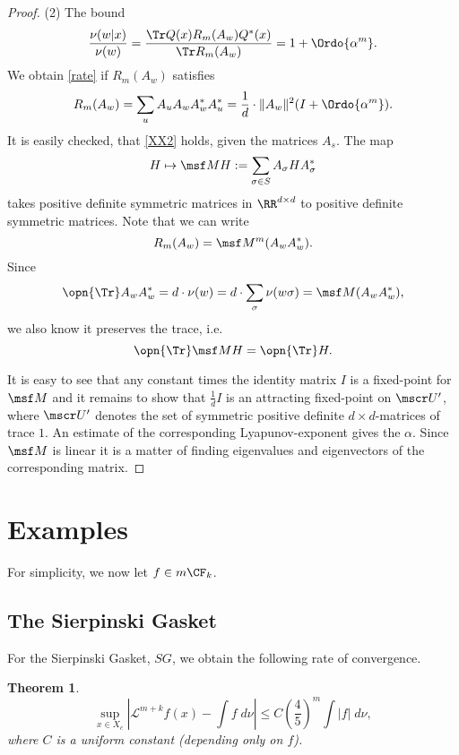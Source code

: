 \documentclass[11pt]{scrartcl}
\theoremstyle{plain} %
\newtheorem{thm}{Theorem}%
\theoremstyle{definition}
\begin{document}
\begin{proof}
(2) The bound 
\begin{equation}\label{rate}
\frac{\nu(w|x)}{\nu(w)}=\frac{\Tr Q(x)R_m(A_w)Q^*(x)}{\Tr R_m(A_w)}=1+\Ordo{\alpha^m}.
\end{equation}
We obtain \eqref{rate} if $R_m(A_w)$ satisfies 
\begin{equation}\label{XX2}
  R_m(A_w) = \sum_u A_u A_w A_w^* A_u^* = \frac1d \cdot \| A_w \|^2 (I+\Ordo{\alpha^m}).
\end{equation}
It is easily checked, that \eqref{XX2} holds, given the matrices $A_s$. The map
$$ H \mapsto \msf M H := \sum_{\sigma\in S} A_\sigma H A_\sigma^* $$
takes positive definite symmetric matrices in $\RR^{d\times d}$ to
positive definite symmetric matrices. 
Note that we can write
$$ R_m(A_w) = \msf M^m (A_w A_w^*). $$
Since
$$\opn{\Tr} A_wA^*_w = d\cdot \nu(w) = d\cdot \sum_\sigma \nu(w\sigma) = \msf M (A_wA_w^*), $$ 
we also know it preserves the trace, i.e.\ 
$$\opn{\Tr} \msf M H = \opn{\Tr} H. $$ 

It is easy to see that any constant times the identity matrix $I$ is a fixed-point for
$\msf M$ and it remains to show that $\frac 1dI$ is an attracting
fixed-point on $\mscr U'$, where $\mscr U'$ denotes the set of symmetric
positive definite $d\times d$-matrices of trace $1$. An estimate
of the corresponding Lyapunov-exponent gives the $\alpha$. Since $\msf
M$ is linear it is a matter of finding eigenvalues and
eigenvectors of the corresponding matrix.
\end{proof}

\section{Examples}
For simplicity, we now let $f\in m \CF_k$.
\subsection{The Sierpinski Gasket}
For the Sierpinski Gasket, $SG$, we obtain the following rate of convergence.
\begin{thm}
$$\sup_{x\in X_c} |{\mathcal L}^{m+k} f(x)-\int f\; d\nu|\leq C\left(\frac{4}{5}\right)^m\int |f|\; d\nu,$$
where $C$ is a uniform constant (depending only on $f$).
\end{thm}
\end{document}
